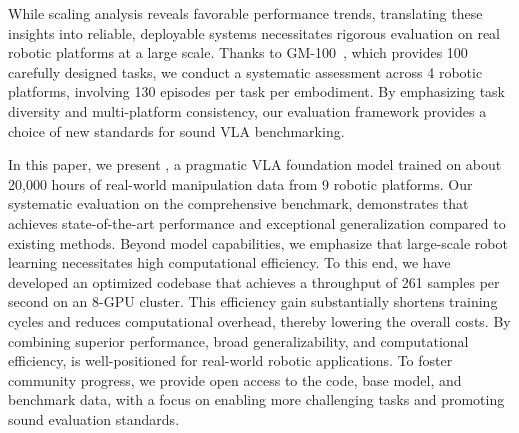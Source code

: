 While scaling analysis reveals favorable performance trends, translating these insights into reliable, deployable systems necessitates rigorous evaluation on real robotic platforms at a large scale. Thanks to GM-100~\cite{gm100}, which provides 100 carefully designed tasks, we conduct a systematic assessment across 4 robotic platforms, involving 130 episodes per task per embodiment. 
By emphasizing task diversity and multi-platform consistency, our evaluation framework provides a choice of new standards for sound VLA benchmarking.
%


In this paper, we present \method, a pragmatic VLA foundation model trained on about 20,000 hours of real-world manipulation data from 9 robotic platforms. 
%
Our systematic evaluation on the comprehensive benchmark, demonstrates that \method achieves state-of-the-art performance and exceptional generalization compared to existing methods. Beyond model capabilities, we emphasize that large-scale robot learning necessitates high computational efficiency. To this end, we have developed an optimized codebase that achieves a throughput of 261 samples per second on an 8-GPU cluster. This efficiency gain substantially shortens training cycles and reduces computational overhead, thereby lowering the overall costs. By combining superior performance, broad generalizability, and computational efficiency, \method is well-positioned for real-world robotic applications. To foster community progress, we provide open access to the code, base model, and benchmark data, with a focus on enabling more challenging tasks and promoting sound evaluation standards.
%

